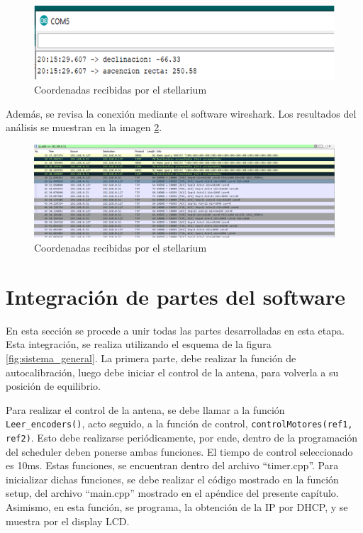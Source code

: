 \begin{figure}[ht!]
	\includegraphics{puerto_comm_stellarium}
	\caption{Coordenadas recibidas por el stellarium}
	\label{fig:coord_test_stell}
\end{figure}


Además, se revisa la conexión mediante el software wireshark. Los resultados del análisis se muestran en la imagen 	\ref{fig:wireshark_stell}.



\begin{figure}[ht!]
	\includegraphics[width=\linewidth]{wireshark_stellarium}
	\caption{Coordenadas recibidas por el stellarium}
	\label{fig:wireshark_stell}
\end{figure}

\section{Integración de partes del software} 

En esta sección se procede a unir todas las partes desarrolladas en esta etapa. Esta integración, se realiza utilizando el esquema de la figura \ref{fig:sistema_general}. La primera parte, debe realizar la función de autocalibración, luego debe iniciar el control de la antena, para volverla a su posición de equilibrio.  

Para realizar el control de la antena, se debe llamar a la función \texttt{Leer_encoders()}, acto seguido, a la función de control, \texttt{controlMotores(ref1, ref2)}. Esto debe realizarse periódicamente, por ende, dentro de la programación del scheduler deben ponerse ambas funciones. El tiempo de control seleccionado es 10ms. Estas funciones, se encuentran dentro del archivo ``timer.cpp''. Para inicializar dichas funciones, se debe realizar el código mostrado en la función setup, del archivo ``main.cpp'' mostrado en el apéndice del presente capítulo. Asimismo, en esta función, se programa, la obtención de la IP por DHCP, y se muestra por el display LCD. 


